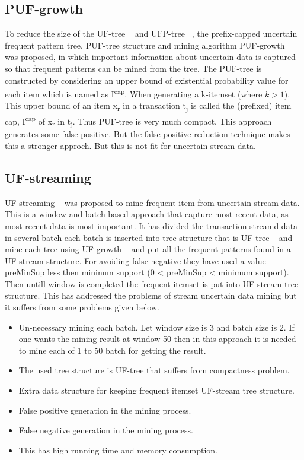 	\subsection{PUF-growth}
	To reduce the size of the UF-tree ~\cite{uf_growth} and UFP-tree ~\cite{ufp_growth}, the preﬁx-capped uncertain frequent pattern tree, PUF-tree structure and mining algorithm PUF-growth ~\cite{puf_growth} was proposed, in which important information about uncertain data is captured so that frequent patterns can be mined from the tree. The PUF-tree  is constructed by considering an upper bound of existential probability value for each item  which is named as I\textsuperscript{cap}. When generating a k-itemset (where $k>1$). This upper bound of an item x\textsubscript{r} in a transaction t\textsubscript{j} is called the (preﬁxed) item cap, I\textsuperscript{cap} of x\textsubscript{r} in t\textsubscript{j}. Thus PUF-tree is very much compact. This approach generates some false positive. But the false positive reduction technique makes this a stronger approch. But this is not fit for uncertain stream data. 
	
	\subsection{UF-streaming}
	UF-streaming ~\cite{suf_growth} was proposed to mine frequent item from uncertain stream data. This is a window and batch based approach that capture most recent data, as most recent data is most important. It has divided the transaction streamd data in several batch each batch is inserted into tree structure that is UF-tree ~\cite{uf_growth} and mine each tree using UF-growth ~\cite{uf_growth} and put all the frequent patterns found in a UF-stream structure. For avoiding false negative they have used a value preMinSup less then mininum support (0 < preMinSup < minimum support). Then untill window is completed the frequent itemset is put into UF-stream tree structure. This has addressed the problems of stream uncertain data mining but it suffers from some problems given below.
	\begin{itemize}
		\item Un-necessary mining each batch. Let window size is 3 and batch size is 2. If one wants the mining result at window 50 then in this approach it is needed to mine each of 1 to 50 batch for getting the result.
		\item The used tree structure is UF-tree that suffers from compactness problem.
		\item Extra data structure for keeping frequent itemset UF-stream tree structure.
		\item False positive generation in the mining process.
		\item False negative generation in the mining process.
		\item This has high running time and memory consumption.
	\end{itemize}
	
